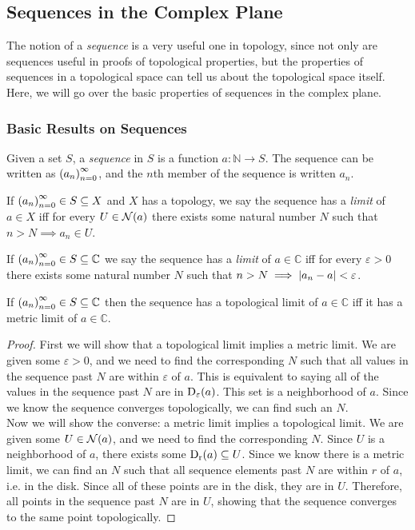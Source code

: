 \subsection{Sequences in the Complex Plane}
The notion of a \emph{sequence} is a very useful one in topology, since not only are sequences useful in proofs of topological properties, but the properties of sequences in a topological space can tell us about the topological space itself. Here, we will go over the basic properties of sequences in the complex plane.
\subsubsection{Basic Results on Sequences}
\begin{definition}[Sequence]
Given a set $S$, a \emph{sequence} in $S$ is a function $a : \mathbb{N} \longrightarrow S$. The sequence can be written as $\seq{a}$, and the $n$th member of the sequence is written $a_n$.
\end{definition}
\begin{definition}
If $\seq{a} \in S \subseteq X$ and $X$ has a topology, we say the sequence has a \emph{limit} of $a \in X$ iff for every $U \in \nbhd{a}$ there exists some natural number $N$ such that $n>N \implies a_n \in U$.
\end{definition}
\begin{definition}
If $\seq{a} \in S \subseteq \mathbb{C}$ we say the sequence has a \emph{limit} of $a \in \mathbb{C}$ iff for every $\varepsilon > 0$ there exists some natural number $N$ such that $n > N \implies \modulus{a_n-a} < \varepsilon$.
\end{definition}
\begin{theorem}
If $\seq{a} \in S \subseteq \mathbb{C}$ then the sequence has a topological limit of $a \in \mathbb{C}$ iff it has a metric limit of $a \in \mathbb{C}$.
\end{theorem}
\begin{proof}
First we will show that a topological limit implies a metric limit. We are given some $\varepsilon > 0$, and we need to find the corresponding $N$ such that all values in the sequence past $N$ are within $\varepsilon$ of $a$. This is equivalent to saying all of the values in the sequence past $N$ are in $\disk{a}{\varepsilon}$. This set is a neighborhood of $a$. Since we know the sequence converges topologically, we can find such an $N$.\\
Now we will show the converse: a metric limit implies a topological limit. We are given some $U \in \nbhd{a}$, and we need to find the corresponding $N$. Since $U$ is a neighborhood of $a$, there exists some $\disk{a}{r} \subseteq U$. Since we know there is a metric limit, we can find an $N$ such that all sequence elements past $N$ are within $r$ of $a$, i.e. in the disk. Since all of these points are in the disk, they are in $U$. Therefore, all points in the sequence past $N$ are in $U$, showing that the sequence converges to the same point topologically.
\end{proof}
